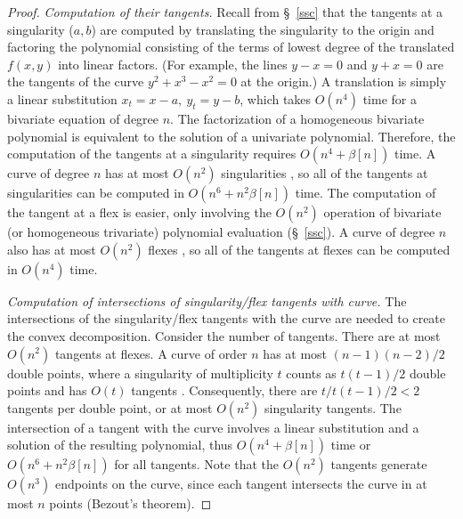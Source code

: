 \begin{proof}
{\em Computation of their tangents.} 
%
Recall from \S~\ref{ssc} that the tangents at a singularity ($a, b$) are computed by 
translating the singularity to the origin and factoring the polynomial consisting of 
the terms of lowest degree of the translated $f(x,y)$ into linear factors.
(For example, the lines $y-x=0$ and $y+x=0$ are the tangents of the curve
$y^{2} + x^{3} - x^{2} = 0$ at the origin.)
A translation is simply a linear substitution $x_{t} = x - a ,\ y_{t} = y - b$,
which takes $O(n^{4})$ time for a bivariate equation of degree $n$.
The factorization of a homogeneous bivariate polynomial is equivalent to the
solution of a univariate polynomial.
Therefore, the computation of the tangents at a singularity requires
$O(n^{4} + \beta[n])$ time.
A curve of degree $n$ has at most $O(n^2)$ singularities \cite{walker},
so all of the tangents at singularities can be computed in $O(n^{6} + n^{2}\beta[n])$
time.
The computation of the tangent at a flex is easier, only involving the $O(n^{2})$
operation of bivariate (or homogeneous trivariate) polynomial evaluation 
(\S~\ref{ssc}).
A curve of degree $n$ also has at most $O(n^{2})$ flexes \cite{walker},
so all of the tangents at flexes can be computed in $O(n^{4})$ time.

{\em Computation of intersections of singularity/flex tangents with curve.}
%
The intersections of the singularity/flex tangents with the curve are needed to
create the convex decomposition.
Consider the number of tangents.
There are at most $O(n^{2})$ tangents at flexes.
A curve of order $n$ has at most $(n-1)(n-2)/2$ double points, where
a singularity of multiplicity $t$ counts as $t(t-1)/2$ double points 
and has $O(t)$ tangents \cite{walker}.
Consequently, there are $t / t(t-1) / 2 < 2$ tangents per double point,
or at most $O(n^{2})$ singularity tangents.
The intersection of a tangent with the curve involves a linear substitution
and a solution of the resulting polynomial, thus $O(n^{4} + \beta[n])$ time or
$O(n^{6} + n^{2}\beta[n])$ for all tangents.
Note that the $O(n^{2})$ tangents generate $O(n^{3})$ endpoints on the curve, since
each tangent intersects the curve in at most $n$ points (Bezout's theorem).


\end{proof}
